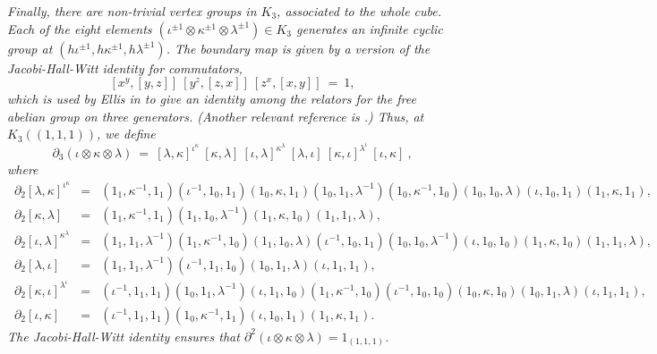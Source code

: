 \begin{example}
\medskip\noindent
\emph{Finally, there are non-trivial vertex groups in $K_3$, 
associated to the whole cube. 
Each of the eight elements 
$(\iota^{\pm 1}\otimes\kappa^{\pm 1}\otimes\lambda^{\pm 1}) \in K_3$ 
generates an infinite cyclic group at 
$(h\iota^{\pm 1},h\kappa^{\pm 1},h\lambda^{\pm 1})$. 
The boundary map is given by a version of the Jacobi-Hall-Witt 
identity for commutators,} 
$$
[x^y,[y,z]]\ [y^z,[z,x]]\ [z^x,[x,y]] ~=~ 1, 
$$
\emph{which is used by Ellis in \cite{ellis-jsc2004} to give an identity 
among the relators for the free abelian group on three generators. 
(Another relevant reference is \cite{brow:higg:1981}.) 
Thus, at $K_3((1,1,1))$, we define} 
$$
\partial_3(\iota\otimes\kappa\otimes\lambda) ~=~ 
[\lambda,\kappa]^{\iota^{\kappa}}\ [\kappa,\lambda]\ 
[\iota,\lambda]^{\kappa^{\lambda}}\ [\lambda,\iota]\ 
[\kappa,\iota]^{\lambda^{\iota}}\ [\iota,\kappa]\ ,
$$
\emph{where} 
\small{
\begin{eqnarray*}
\,\partial_2[\lambda,\kappa]^{\iota^{\kappa}} 
  &=&  (1_1,\kappa^{-1},1_1)(\iota^{-1},1_0,1_1)(1_0,\kappa,1_1) 
         (1_0,1_1,\lambda^{-1})(1_0,\kappa^{-1},1_0) 
           (1_0,1_0,\lambda)(\iota,1_0,1_1)(1_1,\kappa,1_1), \\
\,\partial_2[\kappa,\lambda]~~ 
  &=&  (1_1,\kappa^{-1},1_1)(1_1,1_0,\lambda^{-1}) 
         (1_1,\kappa,1_0)(1_1,1_1,\lambda), \\
\,\partial_2[\iota,\lambda]^{\kappa^{\lambda}} 
  &=&  (1_1,1_1,\lambda^{-1})(1_1,\kappa^{-1},1_0)(1_1,1_0,\lambda) 
         (\iota^{-1},1_0,1_1)(1_0,1_0,\lambda^{-1}) 
           (\iota,1_0,1_0)(1_1,\kappa,1_0)(1_1,1_1,\lambda), \\
\,\partial_2[\lambda,\iota]~~ 
  &=&  (1_1,1_1,\lambda^{-1})(\iota^{-1},1_1,1_0) 
            (1_0,1_1,\lambda)(\iota,1_1,1_1), \\
\,\partial_2[\kappa,\iota]^{\lambda^{\iota}} 
  &=&  (\iota^{-1},1_1,1_1)(1_0,1_1,\lambda^{-1})(\iota,1_1,1_0) 
         (1_1,\kappa^{-1},1_0)(\iota^{-1},1_0,1_0)
           (1_0,\kappa,1_0)(1_0,1_1,\lambda)(\iota,1_1,1_1), \\
\,\partial_2[\iota,\kappa]~~ 
  &=&  (\iota^{-1},1_1,1_1)(1_0,\kappa^{-1},1_1)
            (\iota,1_0,1_1)(1_1,\kappa,1_1). 
\end{eqnarray*}
} 
\emph{The Jacobi-Hall-Witt identity ensures that 
$\partial^2(\iota\otimes\kappa\otimes\lambda) = 1_{(1,1,1)}$.} 
\end{example}


